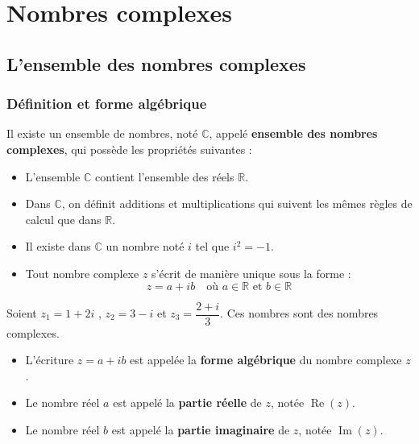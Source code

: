 \chapter{Nombres complexes}

\section{L'ensemble des nombres complexes}

\subsection{Définition et forme algébrique}

\begin{defin}
	Il existe un ensemble de nombres, noté $\mathbb{C}$, appelé \textbf{ensemble des nombres complexes}, qui possède les propriétés suivantes :
	\begin{itemize}
		\item L'ensemble $\mathbb{C}$ contient l'ensemble des réels $\mathbb{R}$.
		\item Dans $\mathbb{C}$, on définit additions et multiplications qui suivent les mêmes règles de calcul que dans $\mathbb{R}$.
		\item Il existe dans $\mathbb{C}$ un nombre noté $i$ tel que $i^2 = -1$.
		\item Tout nombre complexe $z$ s'écrit de manière unique sous la forme :
		      \[
			      z = a + ib \quad \text{où } a \in \mathbb{R} \text{ et } b \in \mathbb{R}
		      \]
	\end{itemize}
\end{defin}

\begin{ex}
	Soient $z_1=1 + 2i$ , $z_2=3-i$ et $z_3=\dfrac{2+i}{3}$. Ces nombres sont des nombres complexes.
\end{ex}

\begin{defin}
	\nline
	\begin{itemize}
		\item L'écriture $z = a + ib$ est appelée la \textbf{forme algébrique} du nombre complexe $z$.
		\item Le nombre réel $a$ est appelé la \textbf{partie réelle} de $z$, notée $\operatorname{Re}(z)$.
		\item Le nombre réel $b$ est appelé la \textbf{partie imaginaire} de $z$, notée $\operatorname{Im}(z)$.
	\end{itemize}
\end{defin}

